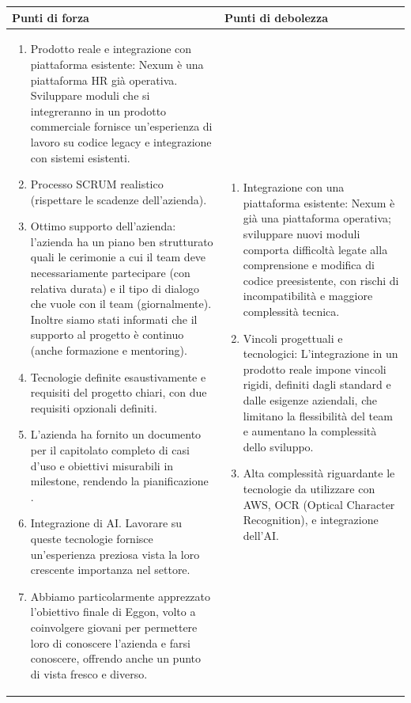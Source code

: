 \documentclass[a4paper,11pt]{article}
\begin{document}
{\footnotesize
\begin{tabularx}{\textwidth}{|X|X|}
\hline
\rowcolor{lightgray!40} %
\textbf{Punti di forza} & \textbf{Punti di debolezza} \\
\hline
\begin{enumerate}
\item Prodotto reale e integrazione con piattaforma esistente: Nexum è una piattaforma HR già operativa. Sviluppare moduli che si integreranno in un prodotto commerciale fornisce un'esperienza di lavoro su codice legacy e integrazione con sistemi esistenti.
\item Processo SCRUM realistico (rispettare le scadenze dell'azienda).
\item Ottimo supporto dell'azienda: l'azienda ha un piano ben strutturato quali le cerimonie a cui il team deve necessariamente partecipare (con relativa durata) e il tipo di dialogo che vuole con il team (giornalmente). Inoltre siamo stati informati che il supporto al progetto è continuo (anche formazione e mentoring).
\item Tecnologie definite esaustivamente e requisiti del progetto chiari, con due requisiti opzionali definiti.
\item L'azienda ha fornito un documento per il capitolato completo di casi d'uso e obiettivi misurabili in milestone, rendendo la pianificazione .
\item Integrazione di AI. Lavorare su queste tecnologie fornisce un'esperienza preziosa vista la loro crescente importanza nel settore.
\item Abbiamo particolarmente apprezzato l'obiettivo finale di Eggon, volto a coinvolgere giovani per permettere loro di conoscere l'azienda e farsi conoscere, offrendo anche un punto di vista fresco e diverso.
\end{enumerate}
& 
\begin{enumerate}
 \item Integrazione con una piattaforma esistente: Nexum è già una piattaforma operativa; sviluppare nuovi moduli comporta difficoltà legate alla comprensione e modifica di codice preesistente, con rischi di incompatibilità e maggiore complessità tecnica.
  \item Vincoli progettuali e tecnologici: L'integrazione in un prodotto reale impone vincoli rigidi, definiti dagli standard e dalle esigenze aziendali, che limitano la flessibilità del team e aumentano la complessità dello sviluppo.
\item Alta complessità riguardante le tecnologie da utilizzare con AWS, OCR (Optical Character Recognition), e integrazione dell'AI.
\end{enumerate} \\
\hline
\end{tabularx}
}
\end{document}
